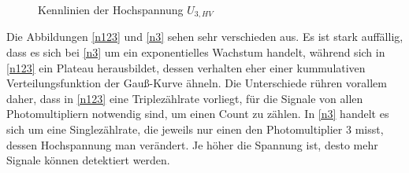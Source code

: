         \begin{figure}[htbp]
            \caption{Kennlinien der Hochspannung $U_{3,HV}$}
        \end{figure}
        Die Abbildungen \ref{n123} und \ref{n3} sehen sehr verschieden aus. Es ist stark auffällig, dass es sich bei \ref{n3} um ein exponentielles Wachstum handelt, während sich in \ref{n123} ein Plateau herausbildet, dessen verhalten eher einer kummulativen Verteilungsfunktion der Gauß-Kurve ähneln. 
        Die Unterschiede rühren vorallem daher, dass in \ref{n123} eine Triplezählrate vorliegt, für die Signale von allen Photomultipliern notwendig sind, um einen Count zu zählen. In \ref{n3} handelt es sich um eine Singlezählrate, die jeweils nur einen den Photomultiplier 3 misst, dessen Hochspannung man verändert. Je höher die Spannung ist, desto mehr Signale können detektiert werden. 